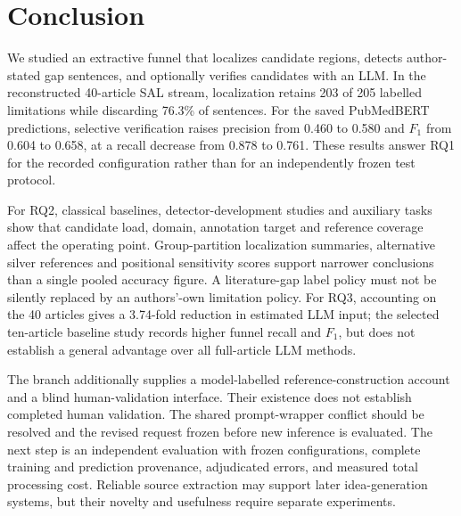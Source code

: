 \section{Conclusion}
\label{S:conclusion}

We studied an extractive funnel that localizes candidate regions, detects author-stated gap
sentences, and optionally verifies candidates with an LLM. In the reconstructed 40-article SAL
stream, localization retains 203 of 205 labelled limitations while discarding 76.3\% of sentences.
For the saved PubMedBERT predictions, selective verification raises precision from 0.460 to 0.580
and $F_1$ from 0.604 to 0.658, at a recall decrease from 0.878 to 0.761. These results answer RQ1
for the recorded configuration rather than for an independently frozen test protocol.

For RQ2, classical baselines, detector-development studies and auxiliary tasks show that
candidate load, domain, annotation target and reference coverage affect the operating point.
Group-partition localization summaries, alternative silver references and positional sensitivity
scores support narrower conclusions than a single pooled accuracy figure. A literature-gap label policy must not be silently
replaced by an authors'-own limitation policy. For RQ3, accounting on the 40 articles gives a
3.74-fold reduction in estimated LLM input; the selected ten-article baseline study records higher
funnel recall and $F_1$, but does not establish a general advantage over all full-article LLM methods.

The branch additionally supplies a model-labelled reference-construction account and a blind
human-validation interface. Their existence does not establish completed human validation.
The shared prompt-wrapper conflict should be resolved and the revised request frozen before
new inference is evaluated. The next step is an independent evaluation with frozen configurations, complete training and
prediction provenance, adjudicated errors, and measured total processing cost. Reliable source
extraction may support later idea-generation systems, but their novelty and usefulness require
separate experiments.
